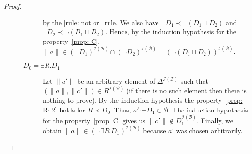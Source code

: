 \documentclass[leqno
,pdflatex
,prodmode
,acmtocl
]{acmsmall}
\newcommand{\mathcmd}[1]{\ensuremath{#1}\xspace}
\def\Not{\neg}
\def\Or{\sqcup}
\newcommand{\branch}[1]{\seg{#1}}
\newcommand{\seg}[1]{\mathcmd{\mathcal{#1}}}
\newcommand{\indiv}{a}
\newcommand{\I}{\mathcal{I}}
\newcommand{\IB}{{\I(\branch{B})}}
\begin{document}
\begin{proof}
\begin{description}
\begin{description}
        by the \eqref{rule: not or}~rule. We also have $\Not D_1\prec\Not(D_1\Or D_2)$ and 
        $\Not D_2\prec\Not(D_1\Or D_2)$.
        Hence, by the induction hypothesis for the property~\eqref{prop: C}, 
        $\|\indiv\|\in(\Not D_1)^\IB\cap(\Not D_2)^\IB=(\Not(D_1\Or D_2))^\IB$.
     \item[$D_0=\exists R.D_1$] Let $\|\indiv'\|$ be an arbitrary element of $\Delta^\IB$ such that
        $(\|\indiv\|,\|\indiv'\|)\in R^\IB$ (if there is no such element then there is nothing to prove).
        By the induction hypothesis the property~\eqref{prop: R: 2} holds
        for $R\prec D_0$. Thus, $\indiv':\Not D_1\in\branch{B}$. The induction hypothesis
        for the property~\eqref{prop: C} gives us $\|\indiv'\|\notin D_1^\IB$. Finally,
        we obtain $\|\indiv\|\in(\Not\exists R.D_1)^\IB$ because $\indiv'$ was chosen arbitrarily.
    \end{description}


\end{description}
\end{proof}
\end{document}
